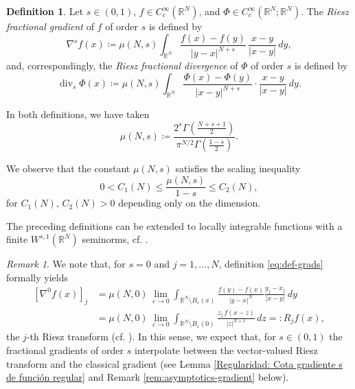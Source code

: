 \documentclass[]{amsart}
\theoremstyle{definition}
\theoremstyle{definition}
\newtheorem{definition}[theorem]{Definition}
\theoremstyle{remark}
\newtheorem{remark}[theorem]{Remark}
\numberwithin{equation}{section}
\begin{document}
\begin{definition}
	Let \(s \in (0,1)\), \(f \in C_{c}^{\infty}\left(\mathbb{R}^{N}\right)\), and \(\Phi \in C_{c}^{\infty}\left(\mathbb{R}^{N}; \mathbb{R}^{N}\right)\). The \emph{Riesz fractional gradient} of $f$ of order $s$ is defined by
    \begin{equation} \label{eq:def-grads}
		\nabla^s f(x) \coloneq \mu(N, s) \int_{\mathbb{R}^{N}} \frac{f(x) - f(y)}{|y - x|^{N + s }}\, \frac{x - y}{|x-y|} \, dy,
	\end{equation}
	and, correspondingly, the \emph{Riesz fractional divergence} of $\Phi$ of order $s$ is defined by
\[
\operatorname{div}_{s} \Phi(x) \coloneq \mu(N, s) \int_{\mathbb{R}^{N}} \frac{\Phi(x) - \Phi(y)}{|x - y|^{N + s}} \cdot \frac{x - y}{|x-y|} \, dy.
	\]
   
    In both definitions, we have taken
    \[
	\mu(N, s) \coloneq \frac{2^{s} \Gamma\left(\frac{N + s + 1}{2}\right)}{\pi^{N / 2} \Gamma\left(\frac{1 - s}{2}\right)}.
	\]
\end{definition}

We observe that the constant \( \mu(N,s) \) satisfies the scaling inequality
\begin{equation} \label{eq:scaling-mu}
	0 < C_1(N) \le \frac{\mu(N,s)}{1 - s} \le C_2(N),
\end{equation}
for  \( C_1(N), \, C_2(N) > 0 \) depending only on the dimension.


The preceding definitions can be extended to locally integrable functions with a finite $W^{s,1}(\mathbb{R}^N)$ seminorms, cf. \cite[Lemma 2.1]{comi2019distributional}.


\begin{remark}
We note that, for $s=0$ and $j = 1 , \ldots, N$, definition \eqref{eq:def-grads} 
formally yields   
\[ \begin{split}
\left[\nabla^0 f(x)\right]_j & = \mu(N,0) \, \lim_{\varepsilon \to 0} \int_{\mathbb{R}^{N}\setminus B_\varepsilon (x)} \frac{f(y) - f(x)}{|y - x|^{N}}\frac{y_j - x_j}{|x-y|}\, dy \\
& = \mu(N,0) \, \lim_{\varepsilon \to 0} \int_{\mathbb{R}^{N}\setminus B_\varepsilon (0)} \frac{z_j \, f(x-z) }{|z|^{N + 1}}\, dz =: R_j f (x),
\end{split} 
\]
the $j$-th Riesz transform (cf. \cite[Chapter III]{stein1970singular}). In this sense, we expect that, for $s \in (0,1)$ the  fractional gradients of order $s$ interpolate between the vector-valued Riesz transform and the classical gradient (see Lemma \ref{Regularidad: Cota gradiente s de función regular}
and Remark \ref{rem:asymptotics-gradient} below).
\end{remark}
\end{document}
